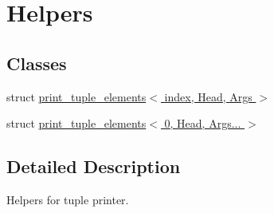\hypertarget{group__helpers}{}\section{Helpers}
\label{group__helpers}
\subsection*{Classes}
\begin{DoxyCompactItemize}
\item 
struct \hyperlink{structprint__tuple__elements}{print\+\_\+tuple\+\_\+elements$<$ index, Head, Args $>$}
\item 
struct \hyperlink{structprint__tuple__elements_3_010_00_01_head_00_01_args_8_8_8_01_4}{print\+\_\+tuple\+\_\+elements$<$ 0, Head, Args... $>$}
\end{DoxyCompactItemize}


\subsection{Detailed Description}
Helpers for tuple printer. 